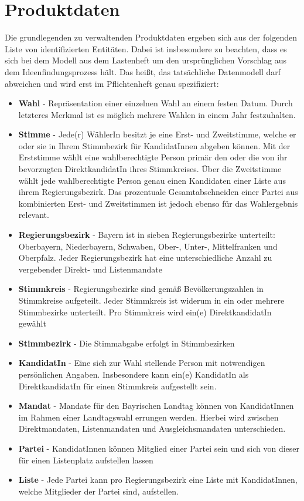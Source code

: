 \documentclass[a4paper,12pt]{article}
\begin{document}
\section{Produktdaten}
Die grundlegenden zu verwaltenden Produktdaten ergeben sich aus der folgenden Liste von
identifizierten Entitäten. Dabei ist insbesondere zu beachten, dass es sich bei dem Modell
aus dem Lastenheft um den ursprünglichen Vorschlag aus dem Ideenfindungsprozess hält. Das heißt,
das tatsächliche Datenmodell darf abweichen und wird erst im Pflichtenheft genau spezifiziert:
\begin{itemize}
  \item \textbf{Wahl} - Repräsentation einer einzelnen Wahl an einem festen Datum. 
        Durch letzteres Merkmal ist es möglich mehrere Wahlen in einem Jahr festzuhalten.
  \item \textbf{Stimme} - Jede(r) WählerIn besitzt je eine Erst- und Zweitstimme, welche er oder sie in Ihrem
        Stimmbezirk für KandidatInnen abgeben können. Mit der Erststimme wählt eine wahlberechtigte Person
        primär den oder die von ihr bevorzugten DirektkandidatIn ihres Stimmkreises. Über die Zweitstimme wählt 
        jede wahlberechtigte Person genau einen Kandidaten einer Liste aus ihrem Regierungsbezirk. Das prozentuale
        Gesamtabschneiden einer Partei aus kombinierten Erst- und Zweitstimmen ist jedoch ebenso für das 
        Wahlergebnis relevant.
  \item \textbf{Regierungsbezirk} - Bayern ist in sieben Regierungsbezirke unterteilt: Oberbayern,
        Niederbayern, Schwaben, Ober-, Unter-, Mittelfranken und Oberpfalz. Jeder Regierungsbezirk
        hat eine unterschiedliche Anzahl zu vergebender Direkt- und Listenmandate
  \item \textbf{Stimmkreis} - Regierungsbezirke sind gemäß Bevölkerungszahlen in Stimmkreise aufgeteilt.
        Jeder Stimmkreis ist widerum in ein oder mehrere Stimmbezirke unterteilt. Pro Stimmkreis wird ein(e)
        DirektkandidatIn gewählt
  \item \textbf{Stimmbezirk} - Die Stimmabgabe erfolgt in Stimmbezirken
  \item \textbf{KandidatIn} - Eine sich zur Wahl stellende Person mit notwendigen persönlichen Angaben. 
        Insbesondere kann ein(e) KandidatIn als DirektkandidatIn für einen Stimmkreis aufgestellt sein.
  \item \textbf{Mandat} - Mandate für den Bayrischen Landtag können von KandidatInnen im Rahmen einer Landtagswahl
        errungen werden. Hierbei wird zwischen Direktmandaten, Listenmandaten und Ausgleichsmandaten unterschieden.
  \item \textbf{Partei} - KandidatInnen können Mitglied einer Partei sein und sich von dieser für einen Listenplatz
        aufstellen lassen
  \item \textbf{Liste} - Jede Partei kann pro Regierungsbezirk eine Liste mit KandidatInnen, welche Mitglieder der 
        Partei sind, aufstellen.
\end{itemize}
\end{document}
